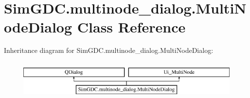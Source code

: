 \hypertarget{class_sim_g_d_c_1_1multinode__dialog_1_1_multi_node_dialog}{}\section{Sim\+G\+D\+C.\+multinode\+\_\+dialog.\+Multi\+Node\+Dialog Class Reference}
\label{class_sim_g_d_c_1_1multinode__dialog_1_1_multi_node_dialog}
Inheritance diagram for Sim\+G\+D\+C.\+multinode\+\_\+dialog.\+Multi\+Node\+Dialog\+:\begin{figure}[H]
\begin{center}
\leavevmode
\includegraphics[height=2.000000cm]{class_sim_g_d_c_1_1multinode__dialog_1_1_multi_node_dialog}
\end{center}
\end{figure}
